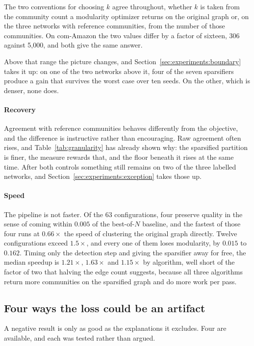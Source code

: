 The two conventions for choosing $k$ agree throughout, whether $k$ is taken from
the community count a modularity optimizer returns on the original graph or, on
the three networks with reference communities, from the number of those
communities. On com-Amazon the two values differ by a factor of sixteen, 306
against 5,000, and both give the same answer.

Above that range the picture changes, and Section~\ref{sec:experiments:boundary} takes it up:
on one of the two networks above it, four of the seven sparsifiers produce a gain
that survives the worst case over ten seeds. On the other, which is denser, none
does.

\paragraph{Recovery}
Agreement with reference communities behaves differently from the objective, and
the difference is instructive rather than encouraging. Raw agreement often rises,
and Table~\ref{tab:granularity} has already shown why: the sparsified partition is
finer, the measure rewards that, and the floor beneath it rises at the same time.
After both controls something still remains on two of the three labelled
networks, and Section~\ref{sec:experiments:exception} takes those up.

\paragraph{Speed}
The pipeline is not faster. Of the 63 configurations, four preserve quality in the
sense of coming within $0.005$ of the best-of-$N$ baseline, and the fastest of
those four runs at $0.66\times$ the speed of clustering the original graph
directly. Twelve configurations exceed $1.5\times$, and every one of them loses
modularity, by $0.015$ to $0.162$. Timing only the detection step and giving the
sparsifier away for free, the median speedup is $1.21\times$, $1.63\times$ and
$1.15\times$ by algorithm, well short of the factor of two that halving the edge
count suggests, because all three algorithms return more communities on the
sparsified graph and do more work per pass.

\subsection{Four ways the loss could be an artifact}\label{sec:experiments:artifact}

A negative result is only as good as the explanations it excludes. Four are
available, and each was tested rather than argued.


